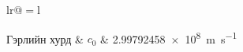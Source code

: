 \addchaptertocentry{\constantsname}

\begin{constants}{lr@{${}={}$}l} %


	Гэрлийн хурд & $c_{0}$ & \SI{2.99792458e8}{\meter\per\second} \\

\end{constants}
 